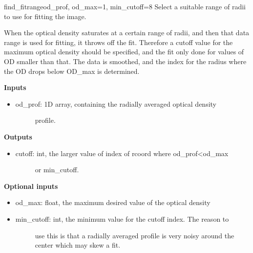 \documentclass[letterpaper,10pt,english]{manual}
\begin{document}
\hypertarget{odysseus.imageprocess.find_fitrange}{}\begin{funcdesc}{find\_fitrange}{od\_prof, od\_max=1, min\_cutoff=8}
Select a suitable range of radii to use for fitting the image.

When the optical density saturates at a certain range of radii, and then
that data range is used for fitting, it throws off the fit. Therefore
a cutoff value for the maximum optical density should be specified, and the
fit only done for values of OD smaller than that. The data is smoothed,
and the index for the radius where the OD drops below OD\_max is determined.

\textbf{Inputs}
\begin{itemize}
\item {} \begin{description}
\item[od\_prof: 1D array, containing the radially averaged optical density] \leavevmode
profile.

\end{description}

\end{itemize}

\textbf{Outputs}
\begin{itemize}
\item {} \begin{description}
\item[cutoff: int, the larger value of index of rcoord where od\_prof\textless{}od\_max] \leavevmode
or min\_cutoff.

\end{description}

\end{itemize}

\textbf{Optional inputs}
\begin{itemize}
\item {} 
od\_max: float, the maximum desired value of the optical density

\item {} \begin{description}
\item[min\_cutoff: int, the minimum value for the cutoff index. The reason to] \leavevmode
use this is that a radially averaged profile is very noisy
around the center which may skew a fit.

\end{description}

\end{itemize}
\end{funcdesc}
\end{document}
